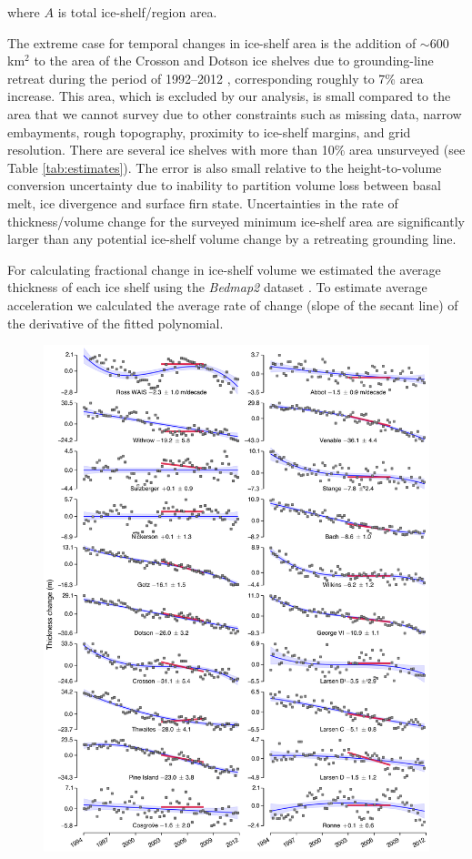 \noindent
where $A$ is total ice-shelf/region area.

The extreme case for temporal changes in ice-shelf area is the addition of
$\sim$600 km$^2$ to the area of the Crosson and Dotson ice shelves due to
grounding-line retreat during the period of 1992--2012 \parencite{Rignot2014},
corresponding roughly to 7\% area increase. This area, which is excluded by
our analysis, is small compared to the area that we cannot survey due to other
constraints such as missing data, narrow embayments, rough topography,
proximity to ice-shelf margins, and grid resolution. There are several ice
shelves with more than 10\% area unsurveyed (see Table \ref{tab:estimates}). The
error is also small relative to the height-to-volume conversion uncertainty
due to inability to partition volume loss between basal melt, ice divergence
and surface firn state. Uncertainties in the rate of thickness/volume change
for the surveyed minimum ice-shelf area are significantly larger than any
potential ice-shelf volume change by a retreating grounding line.

For calculating fractional change in ice-shelf volume we estimated the average
thickness of each ice shelf using the \emph{Bedmap2} dataset
\parencite{Fretwell2013}. To estimate average acceleration we calculated the
average rate of change (slope of the secant line) of the derivative of the
fitted polynomial.


\begin{figure}[!h]
  \centering
  \includegraphics[width=\textwidth]{img/Sup1_ts_shelves_weis_review_v6.png}
\end{figure}

